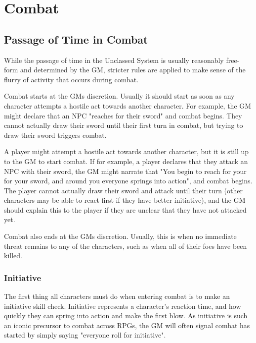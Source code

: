 \chapter{Combat}\label{combat}

\begin{multicols*}{2}

    \section{Passage of Time in Combat}
    While the passage of time in the Unclassed System is usually reasonably
    free-form and determined by the GM, stricter rules are applied to make
    sense of the flurry of activity that occurs during combat.

    Combat starts at the GMs discretion. Usually it should start as soon as
    any character attempts a hostile act towards another character. For
    example, the GM might declare that an NPC "reaches for their sword" and
    combat begins. They cannot actually draw their sword until their first
    turn in combat, but trying to draw their sword triggers combat.

    A player might attempt a hostile act towards another character, but it is
    still up to the GM to start combat. If for example, a player declares that
    they attack an NPC with their sword, the GM might narrate that "You begin
    to reach for your for your sword, and around you everyone springs into
    action", and combat begins. The player cannot actually draw their sword
    and attack until their turn (other characters may be able to react first
    if they have better initiative), and the GM should explain this to the
    player if they are unclear that they have not attacked yet.

    Combat also ends at the GMs discretion. Usually, this is when no immediate
    threat remains to any of the characters, such as when all of their foes
    have been killed.

    \subsection{Initiative}
    The first thing all characters must do when entering combat is to make an
    initiative skill check. Initiative represents a character's reaction time,
    and how quickly they can spring into action and make the first blow. As
    initiative is such an iconic precursor to combat across RPGs, the GM will
    often signal combat has started by simply saying "everyone roll for
    initiative".


\end{multicols*}
